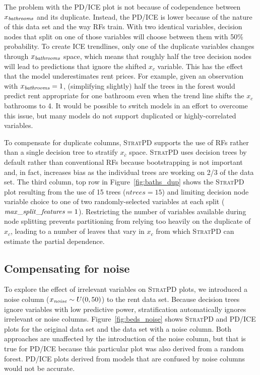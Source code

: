 \documentclass[12pt]{article}
\newcommand{\figref}[1]{Figure~\ref{#1}}
\newcommand{\spd}{\fontfamily{cmr}\textsc{\small StratPD}}
\newcommand{\xnc}{$x_{\overline{c}}$}
\begin{document}
The problem with the PD/ICE plot is not because of codependence between $x_{\it bathrooms}$ and its duplicate. Instead, the PD/ICE is lower because of the nature of this data set and the way RFs train. With two identical variables, decision nodes that split on one of those variables will choose between them with 50\% probability.  To create ICE trendlines, only one of the duplicate variables changes through $x_{\it bathrooms}$ space, which means that roughly half the tree decision nodes will lead to predictions that ignore the shifted $x_c$ variable.  This has the effect that the model underestimates rent prices.  For example, given an observation with $x_{\it bathrooms}=1$, (simplifying slightly) half the trees in the forest would predict rent appropriate for one bathroom even when the trend line shifts the $x_c$ bathrooms to 4. It would be possible to switch models in an effort to overcome this issue, but many models do not support duplicated or highly-correlated variables.

To compensate for duplicate columns, \spd{} supports the use of RFs rather than a single decision tree to stratify \xnc{} space. \spd{} uses decision trees by default rather than conventional RFs because bootstrapping is not important and, in fact, increases bias as the individual trees are working on 2/3 of the data set. The third column, top row in \figref{fig:baths_dup} shows the \spd{} plot resulting from the use of 15 trees ($ntrees=15$) and limiting decision node variable choice to one of two randomly-selected variables at each split (${\it max\_split\_features}=1$).  Restricting the number of variables available during node splitting prevents partitioning from relying too heavily on the duplicate of $x_c$, leading to a number of leaves that vary in $x_c$ from which \spd{} can estimate the partial dependence.

\subsection{Compensating for noise}\label{sec:noise}

To explore the effect of irrelevant variables on \spd{} plots, we introduced a noise column ($x_{\it noise} \sim U(0,50)$) to the rent data set. Because decision trees ignore variables with low predictive power, stratification automatically ignores irrelevant or noise columns.  \figref{fig:beds_noise} shows \spd{} and PD/ICE plots for the original data set and the data set with a noise column. Both approaches are unaffected by the introduction of the noise column, but that is true for PD/ICE because this particular plot was also derived from a random forest. PD/ICE plots derived from models that are confused by noise columns would not be accurate.
\end{document}
